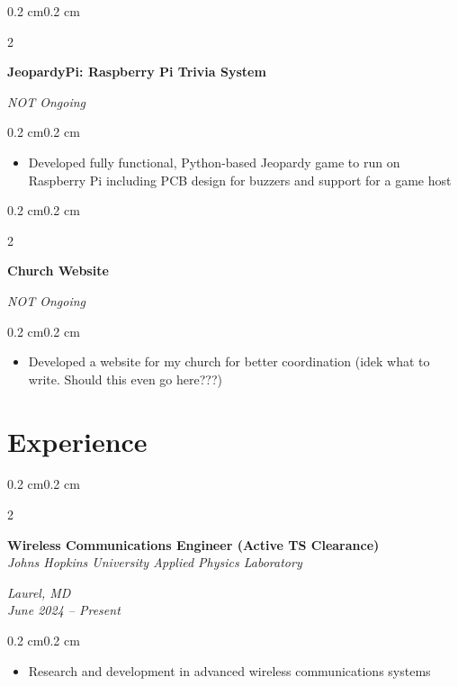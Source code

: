\documentclass[10pt, letterpaper]{article}
\newenvironment{highlights}{
    \begin{itemize}[topsep=0.10 cm,parsep=0.10 cm,partopsep=0pt,itemsep=0pt,leftmargin=0.4 cm + 10pt]
}{
    \end{itemize}
}
\newenvironment{onecolentry}{
    \begin{adjustwidth}{0.2 cm}{0.2 cm}
}{
    \end{adjustwidth}
}
\newenvironment{twocolentry}[2][]{
    \onecolentry
    \def\secondColumn{#2}
    \setcolumnwidth{\fill, 4.5 cm}
    \begin{paracol}{2}
}{
    \switchcolumn \raggedleft \secondColumn
    \end{paracol}
    \endonecolentry
}
\begin{document}
        \vspace{0.2 cm}

        \begin{twocolentry}{\textit{NOT Ongoing}}
            \textbf{JeopardyPi: Raspberry Pi Trivia System}
        \end{twocolentry}
        \vspace{0.10 cm}
        \begin{onecolentry}
            \begin{highlights}
                \item Developed fully functional, Python-based Jeopardy game to run on Raspberry Pi including PCB design for buzzers and support for a game host 
            \end{highlights}
        \end{onecolentry}

        \begin{twocolentry}{\textit{NOT Ongoing}}
            \textbf{Church Website}
        \end{twocolentry}
        \vspace{0.10 cm}
        \begin{onecolentry}
            \begin{highlights}
                \item Developed a website for my church for better coordination (idek what to write. Should this even go here???)
            \end{highlights}
        \end{onecolentry}


    \section{Experience}
        \begin{twocolentry}{\textit{Laurel, MD} \\ \textit{June 2024 – Present}}
            \textbf{Wireless Communications Engineer (Active TS Clearance)} \\
            \textit{Johns Hopkins University Applied Physics Laboratory}
        \end{twocolentry}
        \vspace{0.10 cm}
        \begin{onecolentry}
            \begin{highlights}
                \item Research and development in advanced wireless communications systems
            \end{highlights}
        \end{onecolentry}
\end{document}
